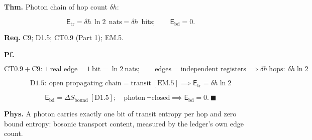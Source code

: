 \begin{theorem}\label{tag:EM-7}
\textbf{Thm.} Photon chain of hop count $\delta h$:

\[
\mathsf E_{\mathrm{tr}}=\delta h\,\ln2\ \ \text{nats}=\delta h\ \ \text{bits};\qquad
\mathsf E_{\mathrm{bd}}=0 .
\]

\textbf{Req.} C9; D1.5; CT0.9 (Part 1); EM.5.

\textbf{Pf.}

\[
\mathrm{CT0.9}+\mathrm{C9}:\ 1\ \text{real edge}=1\ \text{bit}=\ln2\ \text{nats};\qquad
\text{edges}=\text{independent registers}\implies\delta h\ \text{hops}:\ \delta h\ln2
\]

\[
\mathrm{D1.5}:\ \text{open propagating chain}=\text{transit}\ [\mathrm{EM.5}]\implies\mathsf E_{\mathrm{tr}}=\delta h\ln2
\]

\[
\mathsf E_{\mathrm{bd}}=\Delta S_{\mathrm{bound}}\ [\mathrm{D1.5}];\quad\text{photon}\ \neg\text{closed}\implies\mathsf E_{\mathrm{bd}}=0.\ \blacksquare
\]

\textbf{Phys.} A photon carries exactly one bit of transit entropy per hop and zero bound entropy: bosonic transport content, measured by the ledger’s own edge count.

\end{theorem}

